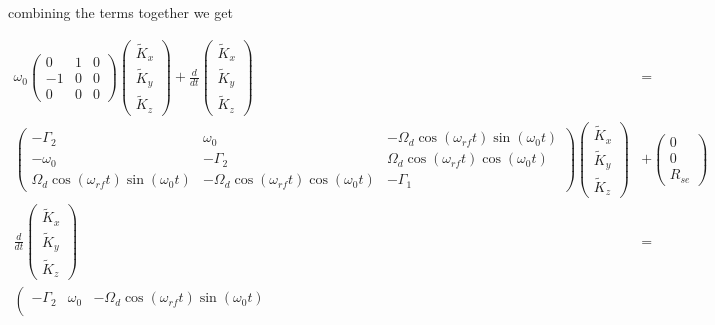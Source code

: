\documentclass{article}
\begin{document}
combining the terms together we get

\begin{align}
    \omega_{0}
    \left(\begin{array}{ccc}
       0 & 1 & 0\\
       -1 & 0 & 0\\
        0 & 0 & 0
    \end{array}\right)
    \left(\begin{array}{c}
        \tilde{K}_{x}\\
        \tilde{K}_{y}\\
        \tilde{K}_{z}
    \end{array}\right) + 
    \frac{d}{dt}\left(\begin{array}{c}
        \tilde{K}_{x}\\
        \tilde{K}_{y}\\
        \tilde{K}_{z}
    \end{array}\right)
    &=\\
   \left(\begin{matrix}
    -\Gamma_2 & \omega_{0}    &  -\Omega_d \cos{(\omega_{rf} t)}\sin(\omega_{0}t) \\
    -\omega_{0} &  - \Gamma_2 &  \Omega_d \cos{(\omega_{rf} t)}\cos(\omega_{0}t) \\ \Omega_d \cos{(\omega_{rf} t)}\sin(\omega_{0}t) &  -\Omega_d \cos{(\omega_{rf} t)}\cos(\omega_{0}t) &  -\Gamma_1 
    \end{matrix}\right)
    \left(\begin{array}{c}
        \tilde{K}_{x}\\
        \tilde{K}_{y}\\
        \tilde{K}_{z}
    \end{array}\right) &+ 
    \left(\begin{matrix}
         0  \\
         0  \\
         R_{se} 
    \end{matrix}\right)\\
    \frac{d}{dt}\left(\begin{array}{c}
        \tilde{K}_{x}\\
        \tilde{K}_{y}\\
        \tilde{K}_{z}
    \end{array}\right)
    &=\\
   \left(\begin{matrix}
    -\Gamma_2 & \omega_{0}    &  -\Omega_d \cos{(\omega_{rf} t)}\sin(\omega_{0}t) \\

\end{matrix}
\end{align}
\end{document}
